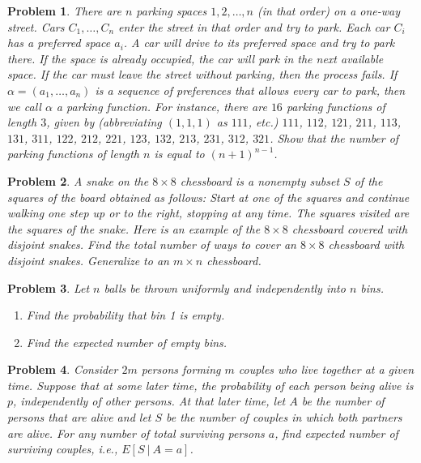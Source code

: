 \documentclass[12pt]{article}
\newtheorem{problem}{Problem}
\begin{document}
\begin{problem}
\textbf{\textcolor{red}{\heart}} There are $n$ parking spaces $1,2,\ldots,n$ (in that order) on a one-way street. Cars $C_1,\ldots,C_n$ enter the street in that order and try to park. Each car $C_i$ has a preferred space $a_i$. A car will drive to its preferred space and try to park there. If the space is already occupied, the car will park in the next available space. If the car must leave the street without parking, then the process fails. If $\alpha = (a_1,\ldots,a_n)$ is a sequence of preferences that allows every car to park, then we call $\alpha$ a parking function. For instance, there are $16$ parking functions of length $3$, given by (abbreviating $(1,1,1)$ as $111$, etc.) $111$, $112$, $121$, $211$, $113$, $131$, $311$, $122$, $212$, $221$, $123$, $132$, $213$, $231$, $312$, $321$. Show that the number of parking functions of length $n$ is equal to $(n+1)^{n-1}$.
\end{problem}

\begin{problem}
A snake on the $8 \times 8$ chessboard is a nonempty subset $S$ of the squares of the board obtained as follows: Start at one of the squares and continue walking one step up or to the right, stopping at any time. The squares visited are the squares of the snake. Here is an example of the $8 \times 8$ chessboard covered with disjoint snakes. Find the total number of ways to cover an $8 \times 8$ chessboard with disjoint snakes. Generalize to an $m \times n$ chessboard.
\end{problem}

\begin{problem}
Let $n$ balls be thrown uniformly and independently into $n$ bins.
    \begin{enumerate}
        \item Find the probability that bin 1 is empty.
        \item Find the expected number of empty bins.
    \end{enumerate}
\end{problem}

\begin{problem}
Consider $2m$ persons forming $m$ couples who live together at a given time. Suppose that at some later time, the probability of each person being alive is $p$, independently of other persons. At that later time, let $A$ be the number of persons that are alive and let $S$ be the number of couples in which both partners are alive. For any number of total surviving persons $a$, find expected number of surviving couples, i.e., $E[S~|~A = a]$.
\end{problem}
\end{document}
